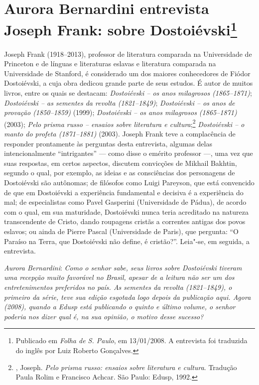 \chapter*{Aurora Bernardini entrevista\\ Joseph Frank: sobre Dostoiévski\footnote{Publicado em \emph{Folha de S. Paulo}, em 13/01/2008. A entrevista foi traduzida do inglês por Luiz Roberto Gonçalves.}}

\label{frank}



Joseph Frank (1918--2013), professor de literatura comparada na Universidade de
Princeton e de línguas e literaturas eslavas e literatura comparada na
Universidade de Stanford, é considerado um dos maiores conhecedores
de Fiódor Dostoiévski, a cuja obra dedicou grande parte de
seus estudos. É autor de muitos livros, entre
os quais se destacam: \emph{Dostoiévski -- os anos milagrosos (1865--1871)}; \emph{Dostoiévski -- as sementes da revolta (1821--1849)}; \emph{Dostoiévski -- os anos de provação
(1850--1859)} (1999); \emph{Dostoiévski -- os anos
milagrosos (1865--1871)} (2003); \emph{Pelo prisma russo -- ensaios sobre literatura e cultura};\footnote{, Joseph. \emph{Pelo prisma russo: ensaios sobre literatura e cultura}. Tradução Paula Rolim e Francisco Achcar. São Paulo: Edusp, 1992.} \emph{Dostoiévski -- o manto do
profeta (1871--1881)} (2003). Joseph
Frank teve a complacência de responder prontamente às perguntas desta
entrevista, algumas delas intencionalmente ``intrigantes'' --- como disse o
emérito professor ---, uma vez que suas respostas, em certos aspectos,
discutem convicções de Mikhail Bakhtin, segundo o qual, por exemplo, as
ideias e as consciências dos personagens de Dostoiévski são autônomas; de filósofos
como Luigi Pareyson, que está convencido de que em Dostoiévski a
experiência fundamental e decisiva é a experiência do mal; de
especialistas como Pavel Gasperini (Universidade de Pádua), de acordo
com o qual, em sua maturidade, Dostoiévski nunca teria acreditado na
natureza transcendente de Cristo, dando roupagens cristãs a correntes antigas dos povos eslavos; ou ainda de Pierre Pascal
(Universidade de Paris), que pergunta: ``O Paraíso na Terra, que
Dostoiévski não define, é cristão?''. Leia"-se, em seguida, a entrevista.

\medskip

\noindent
\emph{Aurora Bernardini}: \emph{Como o senhor sabe, seus livros sobre Dostoiévski tiveram
uma recepção muito favorável no Brasil, apesar de a leitura não ser um
dos entretenimentos preferidos no país. \emph{As sementes da revolta
(1821--1849)}, o primeiro da série, teve sua edição esgotada logo depois da
publicação aqui. Agora (2008), quando a Edusp está publicando o quinto e último
volume, o senhor poderia nos dizer qual é, na sua opinião, o motivo
desse sucesso?}


